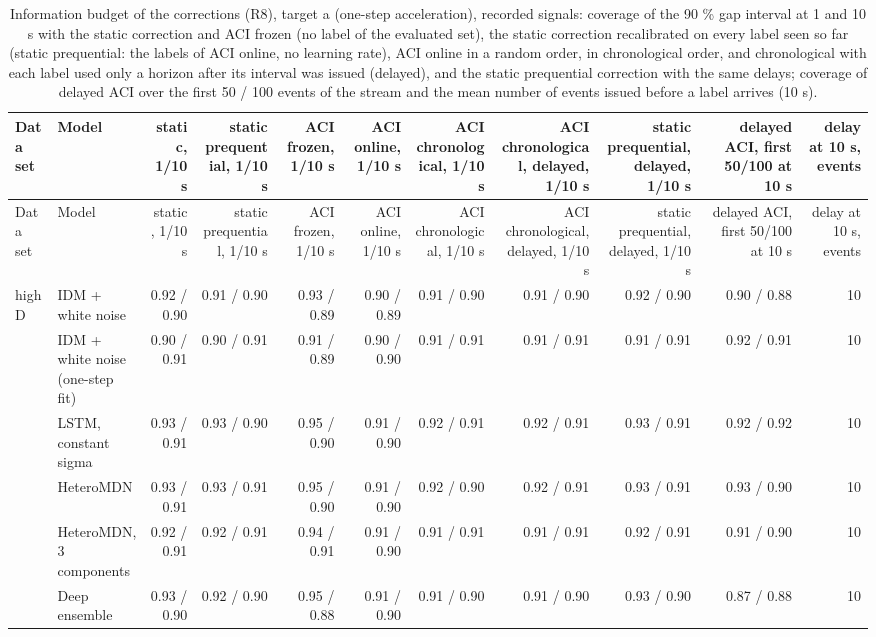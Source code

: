 \begin{longtable}{llrrrrrrrrr}
\caption{Information budget of the corrections (R8), target a (one-step acceleration), recorded signals: coverage of the 90 \% gap interval at 1 and 10 s with the static correction and ACI frozen (no label of the evaluated set), the static correction recalibrated on every label seen so far (static prequential: the labels of ACI online, no learning rate), ACI online in a random order, in chronological order, and chronological with each label used only a horizon after its interval was issued (delayed), and the static prequential correction with the same delays; coverage of delayed ACI over the first 50 / 100 events of the stream and the mean number of events issued before a label arrives (10 s).}\label{tab:t4-info-budget--raw--a} \\
\toprule
Data set & Model & static, 1/10 s & static prequential, 1/10 s & ACI frozen, 1/10 s & ACI online, 1/10 s & ACI chronological, 1/10 s & ACI chronological, delayed, 1/10 s & static prequential, delayed, 1/10 s & delayed ACI, first 50/100 at 10 s & delay at 10 s, events \\
\midrule
\endfirsthead
\toprule
Data set & Model & static, 1/10 s & static prequential, 1/10 s & ACI frozen, 1/10 s & ACI online, 1/10 s & ACI chronological, 1/10 s & ACI chronological, delayed, 1/10 s & static prequential, delayed, 1/10 s & delayed ACI, first 50/100 at 10 s & delay at 10 s, events \\
\midrule
\endhead
\bottomrule
\endlastfoot
highD & IDM + white noise & 0.92 / 0.90 & 0.91 / 0.90 & 0.93 / 0.89 & 0.90 / 0.89 & 0.91 / 0.90 & 0.91 / 0.90 & 0.92 / 0.90 & 0.90 / 0.88 & 10 \\
 & IDM + white noise (one-step fit) & 0.90 / 0.91 & 0.90 / 0.91 & 0.91 / 0.89 & 0.90 / 0.90 & 0.91 / 0.91 & 0.91 / 0.91 & 0.91 / 0.91 & 0.92 / 0.91 & 10 \\
 & LSTM, constant sigma & 0.93 / 0.91 & 0.93 / 0.90 & 0.95 / 0.90 & 0.91 / 0.90 & 0.92 / 0.91 & 0.92 / 0.91 & 0.93 / 0.91 & 0.92 / 0.92 & 10 \\
 & HeteroMDN & 0.93 / 0.91 & 0.93 / 0.91 & 0.95 / 0.90 & 0.91 / 0.90 & 0.92 / 0.90 & 0.92 / 0.91 & 0.93 / 0.91 & 0.93 / 0.90 & 10 \\
 & HeteroMDN, 3 components & 0.92 / 0.91 & 0.92 / 0.91 & 0.94 / 0.91 & 0.91 / 0.90 & 0.91 / 0.91 & 0.91 / 0.91 & 0.92 / 0.91 & 0.91 / 0.90 & 10 \\
 & Deep ensemble & 0.93 / 0.90 & 0.92 / 0.90 & 0.95 / 0.88 & 0.91 / 0.90 & 0.91 / 0.90 & 0.91 / 0.90 & 0.93 / 0.90 & 0.87 / 0.88 & 10 \\

\end{longtable}

